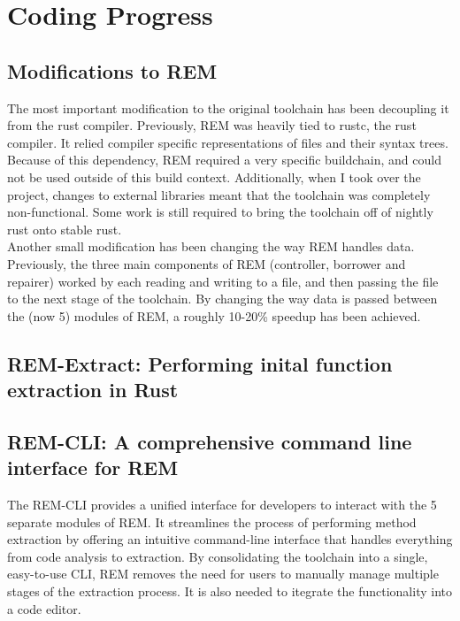 \section{Coding Progress}

\subsection*{Modifications to REM}

The most important modification to the original toolchain has been decoupling it
from the rust compiler. Previously, REM was heavily tied to rustc, the rust
compiler. It relied compiler specific representations of files and their syntax
trees. Because of this dependency, REM required a very specific buildchain, and
could not be used outside of this build context. Additionally, when I took over
the project, changes to external libraries meant that the toolchain was
completely non-functional. Some work is still required to bring the toolchain
off of nightly rust onto stable rust.\\
Another small modification has been changing the way REM handles data.
Previously, the three main components of REM (controller, borrower and repairer)
worked by each reading and writing to a file, and then passing the file to the
next stage of the toolchain. By changing the way data is passed between the (now
5) modules of REM, a roughly 10-20\% speedup has been achieved.

\subsection*{REM-Extract: Performing inital function extraction in Rust}



\subsection*{REM-CLI: A comprehensive command line interface for REM}

The REM-CLI provides a unified interface for developers to interact with the
5 separate modules of REM. It streamlines the process of performing method
extraction by offering an intuitive command-line interface that handles
everything from code analysis to extraction. By consolidating the toolchain into
a single, easy-to-use CLI, REM removes the need for users to manually manage
multiple stages of the extraction process. It is also needed to itegrate the
functionality into a code editor.

